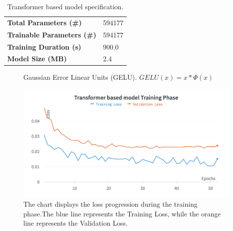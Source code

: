 \begin{table}[H]
	\begin{center}
		\begin{tabular}[c]{l|l}
			\textbf{Total Parameters (\#)}     & 594177 \\
			\textbf{Trainable Parameters (\#)} & 594177 \\
			\textbf{Training Duration (s)}     & 900.0  \\
			\textbf{Model Size (MB)}           & 2.4
		\end{tabular}
	\end{center}
	\caption{Transformer based model specification.}\label{tab:gabspecs}
\end{table}

\begin{figure}[H]
	\centering
	\caption{Gaussian Error Linear Units (GELU). $GELU(x) = x * \Phi(x)$}
	\label{fig:gelu}
\end{figure}

\begin{figure}[H]
	\centering
	\includegraphics[width=.9\textwidth]{chapters/3_models/imgs/gab/gabtraining.png}
	\caption{The chart displays the loss progression during the training phase.The blue line represents the Training Loss, while the orange line represents the Validation Loss.}
	\label{fig:gabtrainchart}
\end{figure}

